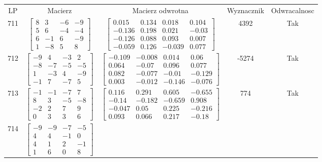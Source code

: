 \documentclass[a4paper,12pt]{article}
\begin{document}
\bgroup {} \vspace{0.2in} \begin{tabular}{c c c c c}
LP & Macierz & Macierz odwrotna & Wyznacznik & Odwracalnosc\\
711
&
$\begin{bmatrix} 8 & 3 & -6 & -9 \\ 5 & 6 & -4 & -4 \\ 6 & -1 & 6 & -9 \\ 1 & -8 & 5 & 8 \end{bmatrix}$
&
$\begin{bmatrix} 0.015 & 0.134 & 0.018 & 0.104 \\ -0.136 & 0.198 & 0.021 & -0.03 \\ -0.126 & 0.088 & 0.093 & 0.007 \\ -0.059 & 0.126 & -0.039 & 0.077 \end{bmatrix}$
&
4392
&
Tak
\\
712
&
$\begin{bmatrix} -9 & 4 & -3 & 2 \\ -8 & -7 & -5 & -5 \\ 1 & -3 & 4 & -9 \\ -1 & 7 & -7 & 5 \end{bmatrix}$
&
$\begin{bmatrix} -0.109 & -0.008 & 0.014 & 0.06 \\ 0.064 & -0.07 & 0.096 & 0.077 \\ 0.082 & -0.077 & -0.01 & -0.129 \\ 0.003 & -0.012 & -0.146 & -0.076 \end{bmatrix}$
&
-5274
&
Tak
\\
713
&
$\begin{bmatrix} -1 & -1 & -7 & 7 \\ 8 & 3 & -5 & -8 \\ -2 & 2 & 7 & 9 \\ 0 & 3 & 3 & 6 \end{bmatrix}$
&
$\begin{bmatrix} 0.116 & 0.291 & 0.605 & -0.655 \\ -0.14 & -0.182 & -0.659 & 0.908 \\ -0.047 & 0.05 & 0.225 & -0.216 \\ 0.093 & 0.066 & 0.217 & -0.18 \end{bmatrix}$
&
774
&
Tak
\\
714
&
$\begin{bmatrix} -9 & -9 & -7 & -5 \\ 4 & 4 & -1 & 0 \\ 4 & 1 & 2 & -1 \\ 1 & 6 & 0 & 8 \end{bmatrix}$

\end{tabular}
\end{document}
